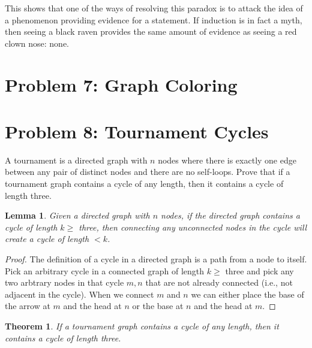 \documentclass[10pt,letter]{article}
\newtheorem*{thm}{Theorem}
\newtheorem{lem}{Lemma}
\begin{document}
This shows that one of the ways of resolving this paradox is to attack the idea of a phenomenon providing evidence for a statement. If induction is in fact a myth, then seeing a black raven provides the same amount of evidence as seeing a red clown nose: none. 

\section*{Problem 7: Graph Coloring}

\pagebreak

\section*{Problem 8: Tournament Cycles}
A tournament is a directed graph with $n$ nodes where there is exactly one edge between any pair of distinct nodes and there are no self-loops. Prove that if a tournament graph contains a cycle of any length, then it contains a cycle of length three.

\begin{lem} Given a directed graph with $n$ nodes, if the directed graph contains a cycle of length $k \ge$ three, then connecting any unconnected nodes in the cycle will create a cycle of length $< k$.
\end{lem}

\begin{proof} The definition of a cycle in a directed graph is a path from a node to itself. Pick an arbitrary cycle in a connected graph of length $k \ge$ three and pick any two arbtrary nodes in that cycle $m, n$ that are not already connected (i.e., not adjacent in the cycle). When we connect $m$ and $n$ we can either place the base of the arrow at $m$ and the head at $n$ or the base at $n$ and the head at $m$. 

\end{proof}

\begin{thm} If a tournament graph contains a cycle of any length, then it contains a cycle of length three.
\end{thm}
\end{document}
